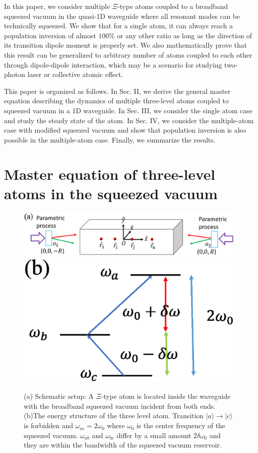 \documentclass[aps,showpacs,twocolumn,twoside,groupedaddress]{revtex4}
\begin{document}
In this paper, we consider multiple $\Xi$-type atoms coupled to a broadband squeezed vacuum in the quasi-1D waveguide where all resonant modes can be technically squeezed. We show that for a single atom, it can always reach a population inversion of almost $100\%$ or any other ratio as long as the direction of its transition dipole moment is properly set. We also mathematically prove that this result can be generalized to arbitrary number of atoms coupled to each other through dipole-dipole interaction, which may be a scenario for studying two-photon laser or collective atomic effect.

This paper is organized as follows. In Sec. II, we derive the general master equation describing the dynamics of multiple three-level atoms coupled to squeezed vacuum in a 1D waveguide. In Sec. III, we consider the single atom case and study the steady state of the atom. In Sec. IV, we consider the multiple-atom case with modified squeezed vacuum and show that population inversion is also possible in the multiple-atom case. Finally, we summarize the results.   

\section{Master equation of three-level atoms in the squeezed vacuum}

\begin{figure}
\includegraphics[width=1.5\columnwidth]{fig1.eps}
\includegraphics[width=0.5\columnwidth]{fig2.eps}
\caption{(a) Schematic setup: A $\Xi$-type atom is located inside the waveguide with the broadband squeezed vacuum incident from both ends. (b)The energy structure of the three level atom. Transition $|a\rangle\rightarrow|c\rangle$ is forbidden and $\omega_{ac}=2\omega_0$ where $\omega_0$ is the center frequency of the squeezed vacuum. $\omega_{ab}$ and $\omega_{bc}$ differ by a small amount $2\delta\omega_0$ and they are within the bandwidth of the squeezed vacuum reservoir.}
\label{1}
\end{figure}
\end{document}
